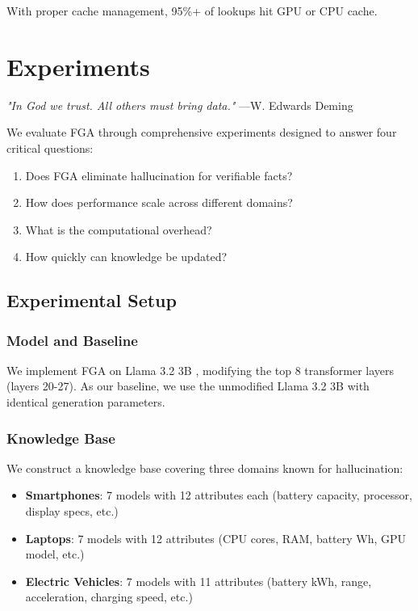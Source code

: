 \documentclass[11pt, a4paper]{article}
\theoremstyle{definition}
\begin{document}
With proper cache management, 95\%+ of lookups hit GPU or CPU cache.

\section{Experiments}

\textit{"In God we trust. All others must bring data."} —W. Edwards Deming

We evaluate FGA through comprehensive experiments designed to answer four critical questions:
\begin{enumerate}
    \item Does FGA eliminate hallucination for verifiable facts?
    \item How does performance scale across different domains?
    \item What is the computational overhead?
    \item How quickly can knowledge be updated?
\end{enumerate}

\subsection{Experimental Setup}

\subsubsection{Model and Baseline}

We implement FGA on Llama 3.2 3B \cite{llama2023}, modifying the top 8 transformer layers (layers 20-27). As our baseline, we use the unmodified Llama 3.2 3B with identical generation parameters.

\subsubsection{Knowledge Base}

We construct a knowledge base covering three domains known for hallucination:

\begin{itemize}
    \item \textbf{Smartphones}: 7 models with 12 attributes each (battery capacity, processor, display specs, etc.)
    \item \textbf{Laptops}: 7 models with 12 attributes (CPU cores, RAM, battery Wh, GPU model, etc.)
    \item \textbf{Electric Vehicles}: 7 models with 11 attributes (battery kWh, range, acceleration, charging speed, etc.)
\end{itemize}
\end{document}
